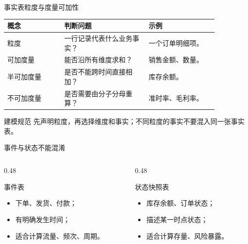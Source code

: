 \documentclass[UTF8,fontset=fandol,aspectratio=169,11pt]{ctexbeamer}
\begin{document}
\begin{frame}{事实表粒度与度量可加性}
\begin{table}
\small
\centering
\begin{tabular}{p{0.23\linewidth}p{0.34\linewidth}p{0.29\linewidth}}
\toprule
概念 & 判断问题 & 示例\\
\midrule
粒度 & 一行记录代表什么业务事实？ & 一个订单明细项。\\
可加度量 & 能否沿所有维度求和？ & 销售金额、数量。\\
半可加度量 & 是否不能跨时间直接相加？ & 库存余额。\\
不可加度量 & 是否需要由分子分母重算？ & 准时率、毛利率。\\
\bottomrule
\end{tabular}
\end{table}

\begin{alertblock}{建模规范}
先声明粒度，再选择维度和事实；不同粒度的事实不要混入同一张事实表。
\end{alertblock}
\end{frame}

\begin{frame}{事件与状态不能混淆}
\begin{columns}[T]
\begin{column}{0.48\linewidth}
\begin{block}{事件表}
\begin{itemize}
  \item 下单、发货、付款；
  \item 有明确发生时间；
  \item 适合计算流量、频次、周期。
\end{itemize}
\end{block}
\end{column}
\begin{column}{0.48\linewidth}
\begin{block}{状态快照表}
\begin{itemize}
  \item 库存余额、订单状态；
  \item 描述某一时点状态；
  \item 适合计算存量、风险暴露。
\end{itemize}
\end{block}
\end{column}
\end{columns}
\end{frame}
\end{document}
